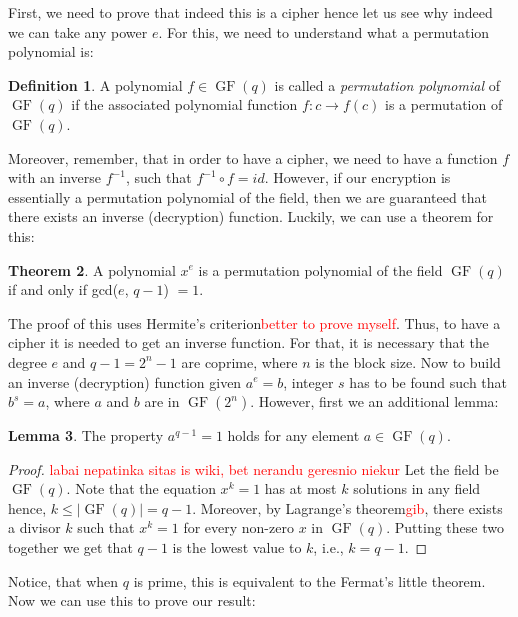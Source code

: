 \documentclass{Resources/UoBLab1}
\theoremstyle{definition}
\newtheorem{theorem}{Theorem}[section]
\newtheorem{definition}[theorem]{Definition}
\newtheorem{lemma}[theorem]{Lemma}
\begin{document}
First, we need to prove that indeed this is a cipher hence let us see why indeed we can take any power $e$. For this, we need to understand what a permutation polynomial is:
\begin{definition}
    A polynomial $f \in \operatorname{GF}(q)$ is called a \textit{permutation polynomial} of $\operatorname{GF}(q)$ if the associated polynomial function $f : c \to f(c)$ is a permutation of $\operatorname{GF}(q)$.
\end{definition}
Moreover, remember, that in order to have a cipher, we need to have a function $f$ with an inverse $f^{-1}$, such that $f^{-1} \circ f = id$. However, if our encryption is essentially a permutation polynomial of the field, then we are guaranteed that there exists an inverse (decryption) function. Luckily, we can use a theorem for this:
\begin{theorem}
    A polynomial $x^e$ is a permutation polynomial of the field $\operatorname{GF}(q)$ if and only if gcd($e$, $q - 1$) $= 1$.
\end{theorem}
The proof of this uses Hermite's criterion\cite{PPIntro}\textcolor{red}{better to prove myself}. Thus, to have a cipher it is needed to get an inverse function. For that, it is necessary that the degree $e$ and $q - 1 = 2^n - 1$ are coprime, where $n$ is the block size. Now to build an inverse (decryption) function given $a^e = b$, integer $s$ has to be found such that $b^s = a$, where $a$ and $b$ are in $\operatorname{GF}(2^n)$. However, first we an additional lemma:
\begin{lemma}\label{lem:GroupProp}
    The property $a^{q-1} = 1$ holds for any element $a \in \operatorname{GF}(q)$.
\end{lemma}
\begin{proof}
    \textcolor{red}{labai nepatinka sitas is wiki, bet nerandu geresnio niekur} Let the field be $\operatorname{GF}(q)$. Note that the equation $x^k = 1$ has at most $k$ solutions in any field hence, $k \le |\operatorname{GF}(q)| = q - 1$. Moreover, by Lagrange's theorem\textcolor{red}{gib}, there exists a divisor $k$ such that $x^k = 1$ for every non-zero $x$ in $\operatorname{GF}(q)$. Putting these two together we get that $q-1$ is the lowest value to $k$, i.e., $k = q - 1$.
\end{proof}
Notice, that when $q$ is prime, this is equivalent to the Fermat's little theorem. Now we can use this to prove our result:
\end{document}
